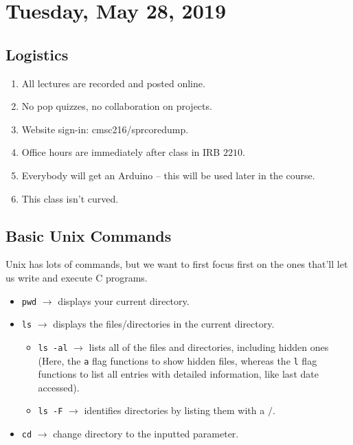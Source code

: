 \section{Tuesday, May 28, 2019}
\subsection{Logistics}
\begin{enumerate}
\item All lectures are recorded and posted online.
\item No pop quizzes, no collaboration on projects.
\item Website sign-in: cmsc216/sprcoredump.
\item Office hours are immediately after class in IRB $2210$.
\item Everybody will get an Arduino -- this will be used later in the course. 
\item This class isn't curved.
\end{enumerate}

\newcommand{\ra}{\rightarrow}
\subsection{Basic Unix Commands}
Unix has lots of commands, but we want to first focus first on the ones that'll let us write and execute C programs. 
\begin{itemize}
    \item \verb!pwd! $\ra$  displays your current directory.
    \item \verb!ls! $\ra$ displays the files/directories in the current directory.
    \begin{itemize}
        \item \verb!ls -al! $\ra$ lists all of the files and directories, including hidden ones (Here, the \verb!a! flag functions to show hidden files, whereas the \verb!l! flag functions to list all entries with detailed information, like last date accessed). 
        \item \verb!ls -F! $\ra$ identifies directories by listing them with a $/$.
    \end{itemize}
    \item \verb!cd! $\ra$ change directory to the inputted parameter.
\end{itemize}


